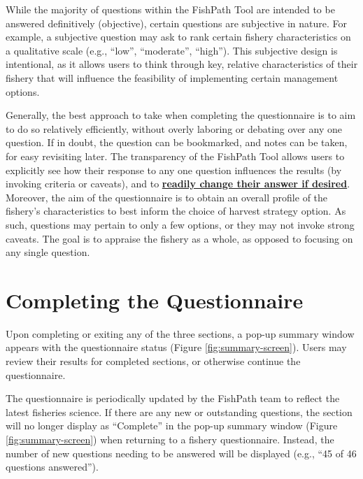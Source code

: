 \documentclass[
  11pt,
]{book}
\begin{document}
While the majority of questions within the FishPath Tool are intended to be answered definitively (objective), certain questions are subjective in nature. For example, a subjective question may ask to rank certain fishery characteristics on a qualitative scale (e.g., ``low'', ``moderate'', ``high''). This subjective design is intentional, as it allows users to think through key, relative characteristics of their fishery that will influence the feasibility of implementing certain management options.

Generally, the best approach to take when completing the questionnaire is to aim to do so relatively efficiently, without overly laboring or debating over any one question. If in doubt, the question can be bookmarked, and notes can be taken, for easy revisiting later. The transparency of the FishPath Tool allows users to explicitly see how their response to any one question influences the results (by invoking criteria or caveats), and to \protect\hyperlink{bookmarked-questions-and-influential-answers}{\textbf{readily change their answer if desired}}. Moreover, the aim of the questionnaire is to obtain an overall profile of the fishery's characteristics to best inform the choice of harvest strategy option. As such, questions may pertain to only a few options, or they may not invoke strong caveats. The goal is to appraise the fishery as a whole, as opposed to focusing on any single question.

\hypertarget{completing-the-questionnaire}{%
\section{Completing the Questionnaire}\label{completing-the-questionnaire}}

Upon completing or exiting any of the three sections, a pop-up summary window appears with the questionnaire status (Figure \ref{fig:summary-screen}). Users may review their results for completed sections, or otherwise continue the questionnaire.

The questionnaire is periodically updated by the FishPath team to reflect the latest fisheries science. If there are any new or outstanding questions, the section will no longer display as ``Complete'' in the pop-up summary window (Figure \ref{fig:summary-screen}) when returning to a fishery questionnaire. Instead, the number of new questions needing to be answered will be displayed (e.g., ``45 of 46 questions answered'').
\end{document}
